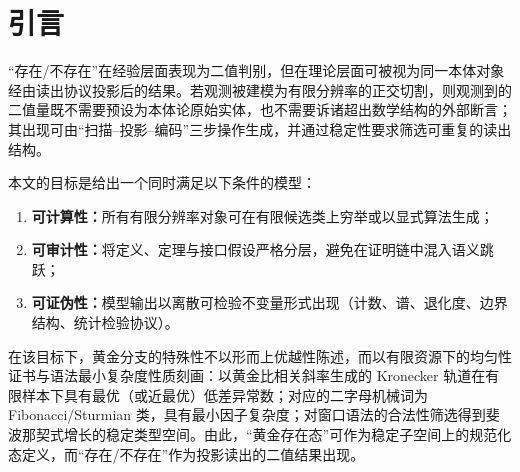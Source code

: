 \section{引言}

“存在/不存在”在经验层面表现为二值判别，但在理论层面可被视为同一本体对象经由读出协议投影后的结果。若观测被建模为有限分辨率的正交切割，则观测到的二值量既不需要预设为本体论原始实体，也不需要诉诸超出数学结构的外部断言；其出现可由“扫描--投影--编码”三步操作生成，并通过稳定性要求筛选可重复的读出结构。

本文的目标是给出一个同时满足以下条件的模型：
\begin{enumerate}
  \item \textbf{可计算性：}所有有限分辨率对象可在有限候选类上穷举或以显式算法生成；
  \item \textbf{可审计性：}将定义、定理与接口假设严格分层，避免在证明链中混入语义跳跃；
  \item \textbf{可证伪性：}模型输出以离散可检验不变量形式出现（计数、谱、退化度、边界结构、统计检验协议）。
\end{enumerate}

在该目标下，黄金分支的特殊性不以形而上优越性陈述，而以有限资源下的均匀性证书与语法最小复杂度性质刻画：以黄金比相关斜率生成的 Kronecker 轨道在有限样本下具有最优（或近最优）低差异常数；对应的二字母机械词为 Fibonacci/Sturmian 类，具有最小因子复杂度；对窗口语法的合法性筛选得到斐波那契式增长的稳定类型空间。由此，“黄金存在态”可作为稳定子空间上的规范化态定义，而“存在/不存在”作为投影读出的二值结果出现。

